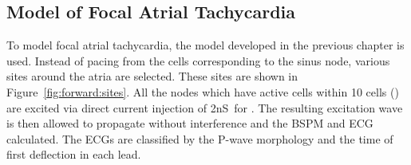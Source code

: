 \subsection{Model of Focal Atrial Tachycardia}

To model focal atrial tachycardia, the model developed in the previous chapter
is used.
Instead of pacing from the cells corresponding to the sinus node, various sites
around the atria are selected.
These sites are shown in Figure~\ref{fig:forward:sites}.
All the nodes which have active cells within 10 cells () are excited via
direct current injection of \unit{2}{nS}\ for .
The resulting excitation wave is then allowed to propagate without interference
and the BSPM and ECG calculated.
The ECGs are classified by the P-wave morphology and the time of first
deflection in each lead.



